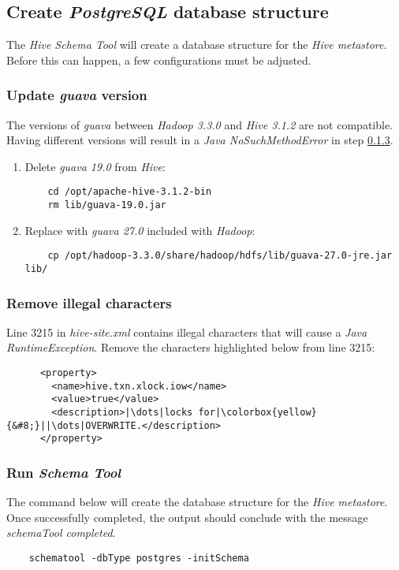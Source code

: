 \documentclass{article}
\begin{document}
  \subsection{Create \emph{PostgreSQL} database structure}
  The \emph{Hive Schema Tool} will create a database structure for the \emph{Hive metastore}.
  Before this can happen, a few configurations must be adjusted.
        
    \subsubsection{Update \emph{guava} version}
    The versions of \emph{guava} between \emph{Hadoop 3.3.0} and \emph{Hive 3.1.2} are not
    compatible. Having different versions will result in a \emph{Java NoSuchMethodError} in step
    \ref{subsec:schematool}.
    \begin{enumerate}
    \item Delete \emph{guava 19.0} from \emph{Hive}:
    \begin{verbatim}
    cd /opt/apache-hive-3.1.2-bin
    rm lib/guava-19.0.jar
    \end{verbatim}
    
    \item Replace with \emph{guava 27.0} included with \emph{Hadoop}:
    \begin{verbatim}
    cp /opt/hadoop-3.3.0/share/hadoop/hdfs/lib/guava-27.0-jre.jar lib/
    \end{verbatim}
    \end{enumerate}
        
    \subsubsection{Remove illegal characters}
    Line 3215 in \emph{hive-site.xml} contains illegal characters that will cause a
    \emph{Java RuntimeException}. Remove the characters highlighted below from line 3215:
    \begin{verbatim}
      <property>
        <name>hive.txn.xlock.iow</name>
        <value>true</value>
        <description>|\dots|locks for|\colorbox{yellow}{&#8;}||\dots|OVERWRITE.</description>
      </property>
    \end{verbatim}
        
    \subsubsection{Run \emph{Schema Tool}}
    \label{subsec:schematool}
    The command below will create the database structure for the \emph{Hive metastore}. Once
    successfully completed, the output should conclude with the message
    \emph{schemaTool completed}.
    \begin{verbatim}
    schematool -dbType postgres -initSchema
    \end{verbatim}
        
\end{document}
